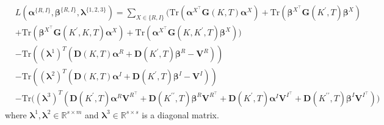 \documentclass[11pt]{article}
\newcommand{\RR}{\mathbb{R}}
\newcommand{\Tr}{\mathrm{Tr}}
\newcommand{\balpha}{\bm \alpha}
\newcommand{\blambda}{\bm \lambda}
\newcommand{\bbeta}{\bm \beta}
\newcommand{\bD}{\bm D}
\newcommand{\bG}{\bm G}
\newcommand{\bV}{\bm V}
\begin{document}
\begin{align}
&L(\balpha^{\{R,I\}},\bbeta^{\{R,I\}}, \blambda^{\{1,2,3\}}) = \sum_{X \in \{R, I\}} \bigg(\Tr(\balpha^{X^\top}\bG(K, T)\balpha^X) + \Tr(\bbeta^{X^\top}\bG(K^\prime, T)\bbeta^X) 
\\&+ \Tr(\bbeta^{X^\top}\bG(K^\prime, K, T)\balpha^X) + \Tr(\balpha^{X^\top}\bG(K, K^\prime, T)\bbeta^X) \bigg)\\
&-\Tr\left( (\blambda^1)^T\left( \bD(K, T)\balpha^R + \bD(K^\prime, T)\bbeta^R - \bV^R \right) \right) \\
& - \Tr\left( (\blambda^2)^T\left(\bD(K, T)\balpha^I + \bD(K^\prime, T)\bbeta^I - \bV^I\right) \right)\\
& - \Tr\bigg( (\blambda^3)^T\left( \bD(K^{\prime}, T)\balpha^R\bV^{R^\top} + \bD(K^{\prime\prime}, T)\bbeta^R\bV^{R^\top} + \bD(K^{\prime}, T)\balpha^I\bV^{I^\top} + \bD(K^{\prime\prime}, T)\bbeta^I\bV^{I^\top} \right)\bigg)  \label{1223}
\end{align}
where $ \blambda^1,\blambda^2\in\RR^{s\times m} $ and $ \blambda^3\in\RR^{s\times s} $  is a diagonal matrix. 
\end{document}
